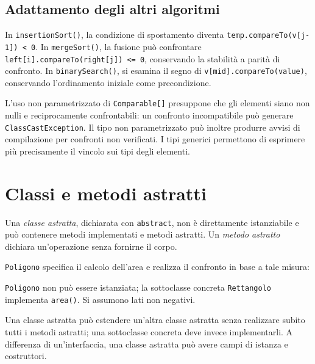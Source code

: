 \subsection{Adattamento degli altri algoritmi}
\label{sec:fi-java-interfacce-altri-algoritmi}

In \texttt{insertionSort()}, la condizione di spostamento diventa
\lstinline|temp.compareTo(v[j-1]) < 0|. In \texttt{mergeSort()},
la fusione può confrontare
\lstinline|left[i].compareTo(right[j]) <= 0|, conservando la
stabilità a parità di confronto. In \texttt{binarySearch()},
si esamina il segno di \lstinline|v[mid].compareTo(value)|,
conservando l'ordinamento iniziale come precondizione.

L'uso non parametrizzato di \texttt{Comparable[]} presuppone
che gli elementi siano non nulli e reciprocamente confrontabili:
un confronto incompatibile può generare
\texttt{ClassCastException}. Il tipo non parametrizzato può
inoltre produrre avvisi di compilazione per confronti non verificati.
I tipi generici permettono di esprimere più precisamente il vincolo
sui tipi degli elementi.

\section{Classi e metodi astratti}
\label{sec:fi-java-interfacce-astratte}

\begin{definition}
\label{def:fi-java-interfacce-astratte}
Una \emph{classe astratta}, dichiarata con \texttt{abstract},
non è direttamente istanziabile e può contenere metodi
implementati e metodi astratti. Un \emph{metodo astratto}
dichiara un'operazione senza fornirne il corpo.
\end{definition}

\begin{example}
\texttt{Poligono} specifica il calcolo dell'area e realizza il
confronto in base a tale misura:

\noindent
\begin{minipage}{\linewidth}

\end{minipage}

\texttt{Poligono} non può essere istanziata; la sottoclasse
concreta \texttt{Rettangolo} implementa \texttt{area()}.
Si assumono lati non negativi.
\end{example}

Una classe astratta può estendere un'altra classe astratta senza
realizzare subito tutti i metodi astratti; una sottoclasse
concreta deve invece implementarli. A differenza di
un'interfaccia, una classe astratta può avere campi di
istanza e costruttori.

